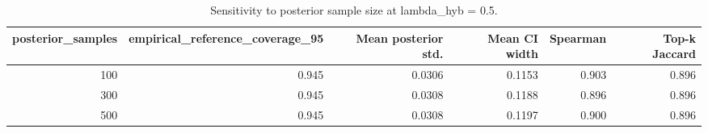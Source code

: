 \begin{table}[t]
\centering
\caption{Sensitivity to posterior sample size at lambda\_hyb = 0.5.}
\label{tab:posterior_sensitivity}
\begin{tabular}{r r r r r r}
        \hline
        posterior\_samples & empirical\_reference\_coverage\_95 & Mean posterior std. & Mean CI width & Spearman & Top-k Jaccard \\
        \hline
        100 & 0.945 & 0.0306 & 0.1153 & 0.903 & 0.896 \\
        300 & 0.945 & 0.0308 & 0.1188 & 0.896 & 0.896 \\
        500 & 0.945 & 0.0308 & 0.1197 & 0.900 & 0.896 \\
        \hline
\end{tabular}
\end{table}
